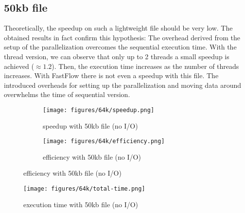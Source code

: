 \documentclass{article}
\begin{document}
\subsection{50kb file}
Theoretically, the speedup on such a lightweight file should be very low.
The obtained results in fact confirm this hypothesis: The overhead derived
from the setup of the parallelization overcomes the sequential execution time.
With the thread version, we can observe that only up to 2 threads a small speedup is achieved ($\approx 1.2$).
Then, the execution time increases as the number of threads increases.
With FastFlow there is not even a speedup with this file. The introduced overheads
for setting up the parallelization and moving data around overwhelms the time of sequential version.
\begin{figure}[H]
    \begin{subfigure}{0.6\textwidth}
        \centering
        \texttt{[image: figures/64k/speedup.png]}
        \caption{speedup with 50kb file (no I/O)}
    \end{subfigure}
    \begin{subfigure}{0.6\textwidth}
        \centering
        \texttt{[image: figures/64k/efficiency.png]}
        \caption{efficiency with 50kb file (no I/O)}
    \end{subfigure}
\end{figure}
\begin{figure}[H]
        \centering
        \texttt{[image: figures/64k/total-time.png]}
        \caption{execution time with 50kb file (no I/O)}
\end{figure}
\end{document}
